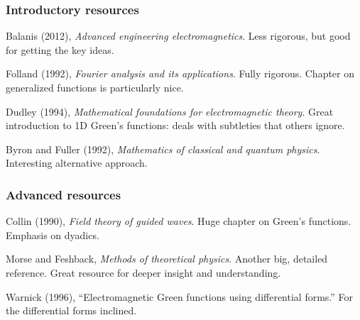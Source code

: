 \documentclass[12 pt, compress, handout, intlimits]{beamer}
\begin{document}
\note{}

\begin{frame}[fragile]
    \frametitle{Introductory resources}
    Balanis (2012), \emph{Advanced engineering electromagnetics}. 
    Less rigorous, but good for getting the key ideas.

    Folland (1992), \emph{Fourier analysis and its applications}. 
    Fully rigorous. 
    Chapter on generalized functions is particularly nice.

    Dudley (1994), \emph{Mathematical foundations for electromagnetic theory}.
    Great introduction to 1D Green's functions: deals with subtleties that others ignore.

    Byron and Fuller (1992), \emph{Mathematics of classical and quantum physics}.
    Interesting alternative approach.
    
\end{frame}

\note{}

\begin{frame}[fragile]
    \frametitle{Advanced resources}
    Collin (1990), \emph{Field theory of guided waves}. 
    Huge chapter on Green's functions. Emphasis on dyadics.

    Morse and Feshback, \emph{Methods of theoretical physics}.
    Another big, detailed reference. Great resource for deeper insight and understanding.

    Warnick (1996), ``Electromagnetic Green functions using differential forms.''
    For the differential forms inclined.

\end{frame}    

\note{}
\end{document}
